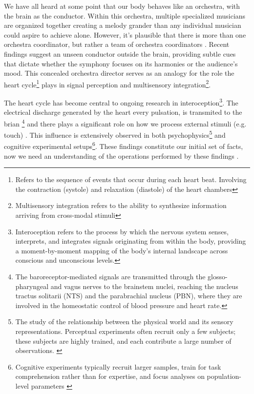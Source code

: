 \documentclass[12pt,oneside,openright]{report}
\begin{document}
We have all heard at some point that our body behaves like an orchestra, with the brain as the conductor. Within this orchestra, multiple specialized musicians are organized together creating a melody grander than any individual musician could aspire to achieve alone. However, it's plausible that there is more than one orchestra coordinator, but rather a team of orchestra coordinators \parencite{Morten2021}. Recent findings suggest an unseen conductor outside the brain, providing subtle cues that dictate whether the symphony focuses on its harmonies or the audience's mood. This concealed orchestra director serves as an analogy for the role the heart cycle\footnote{Refers to the sequence of events that occur during each heart beat. Involving the contraction (systole) and relaxation (diastole) of the heart chambers} plays in signal perception and multisensory integration\footnote{Multisensory integration refers to the ability to synthesize information arriving from cross-modal stimuli}.

The heart cycle has become central to ongoing research in interoception\footnote{Interoception refers to the process by which the nervous system senses, interprets, and integrates signals originating from within the body, providing a moment-by-moment mapping of the body's internal landscape across conscious and unconscious levels.\parencite{Khalsa2017InteroceptionAM}}. The electrical discharge generated by the heart every pulsation, is transmited to the brian \footnote{The baroreceptor-mediated signals are transmitted through the glosso-pharyngeal and vagus nerves to the brainstem nuclei, reaching the nucleus tractus solitarii (NTS) and the parabrachial nucleus (PBN), where they are involved in the homeostatic control of blood pressure and heart rate.\parencite{SALTAFOSSI2023108642}} and there plays a significant role on how we process external stimuli (e.g. touch) \parencite{esra_p}. This influence is extensively observed in both psychophysics\footnote{The study of the relationship between the physical world and its sensory representations. Perceptual experiments often recruit only a few subjects; these subjects are highly trained, and each contribute a large number of observations. \parencite{KINGDOM2012234,WASKOM2019100}} and cognitive experimental setups\footnote{Cognitive experiments typically recruit larger samples, train for task comprehension rather than for expertise, and focus analyses on population-level parameters \parencite{WASKOM2019100}}. These findings constitute our initial set of facts, now we need an understanding of the operations performed by these findings \parencite{Barlow2012PossiblePU}. 
\end{document}
